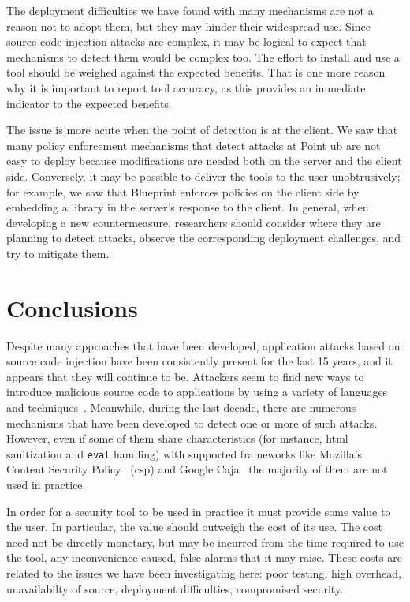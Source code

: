 \documentclass[conference]{IEEEtran}
\begin{document}
The deployment difficulties we have found with many mechanisms are not
a reason not to adopt them, but they may hinder their widespread use.
Since source code injection attacks are complex, it may be logical to
expect that mechanisms to detect them would be complex too. The effort
to install and use a tool should be weighed against the expected
benefits. That is one more reason why it is important to report tool
accuracy, as this provides an immediate indicator to the expected
benefits. 

The issue is more acute when the point of detection is at the client.
We saw that many policy enforcement mechanisms that detect attacks at
Point {\sc ub} are not easy to deploy because modifications are needed
both on the server and the client side.
Conversely, it may be possible to deliver
the tools to the user unobtrusively; for example, we saw that
Blueprint enforces policies on the client side by embedding a library
in the server's response to the client. In general, when developing a
new countermeasure, researchers should consider where they are
planning to detect attacks, observe the corresponding deployment
challenges, and try to mitigate them.

\section{Conclusions}
\label{sec:conclusion}

Despite many approaches that have been developed,
application attacks based on source code injection
have been consistently present for the last 15 years,
and it appears that they will continue to be.
Attackers seem to find new ways to introduce
malicious source code to applications by using a
variety of languages and techniques~\cite{HNSHS12,DKH14}.
Meanwhile, during the last decade, there are
numerous mechanisms that have been developed to
detect one or more of such attacks. However,
even if some of them share characteristics
(for instance, {\sc html} sanitization and {\tt eval} handling)
with supported frameworks like Mozilla's Content Security
Policy~\cite{cspMoz} ({\sc csp}) and Google Caja~\cite{M06,caja}
the majority of them are not used in practice.

In order for a security tool to be used in practice it must provide
some value to the user. In particular, the value should outweigh the
cost of its use. The cost need not be directly monetary, but may be
incurred from the time required to use the tool, any inconvenience
caused, false alarms that it may raise. These costs are related to the
issues we have been investigating here: poor testing, high overhead,
unavailabilty of source, deployment difficulties, compromised security. 
\end{document}
